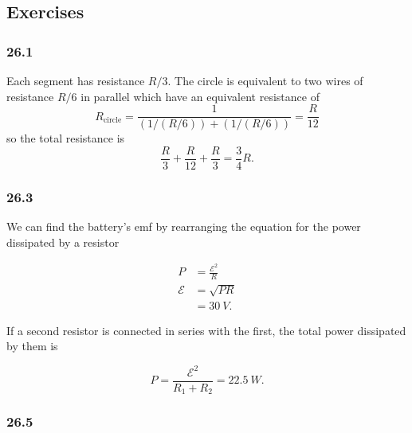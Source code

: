 \documentclass{article}
\begin{document}
\subsection{Exercises}

\subsubsection{26.1}

Each segment has resistance $R / 3$. The circle is equivalent to two wires of resistance $R / 6$ in parallel which have an equivalent resistance of \[R_\textrm{circle} = \frac{1}{(1 / (R / 6)) + (1 / (R / 6))} = \frac{R}{12}\] so the total resistance is \[\frac{R}{3} + \frac{R}{12} + \frac{R}{3} = \frac{3}{4} R.\]

\subsubsection{26.3}

We can find the battery's emf by rearranging the equation for the power dissipated by a resistor

\begin{align*}
  P           & = \frac{\mathcal{E}^2}{R} \\
  \mathcal{E} & = \sqrt{P R}              \\
              & = \qty{30}{V}.
\end{align*}

If a second resistor is connected in series with the first, the total power dissipated by them is

\[P = \frac{\mathcal{E}^2}{R_1 + R_2} = \qty{22.5}{W}.\]

\subsubsection{26.5}
\end{document}
